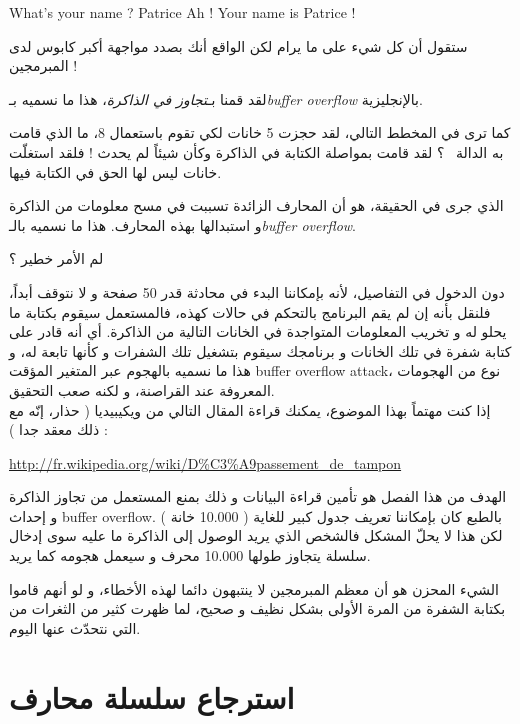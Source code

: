 \begin{Console}
What's your name ? Patrice
Ah ! Your name is Patrice !
\end{Console}

ستقول أن كل شيء على ما يرام لكن الواقع أنك بصدد مواجهة أكبر كابوس لدى المبرمجين !

لقد قمنا بـ\emph{تجاوز في الذاكرة}،
 هذا ما نسميه بـ\emph{\textenglish{buffer overflow}}
بالإنجليزية.

كما ترى في المخطط التالي، لقد حجزت 5 خانات لكي تقوم باستعمال 8، ما الذي قامت به الدالة
~؟
 لقد قامت بمواصلة الكتابة في الذاكرة وكأن شيئاً لم يحدث ! فلقد استغلّت خانات ليس لها الحق في الكتابة فيها.


الذي جرى في الحقيقة، هو أن المحارف الزائدة تسببت في مسح معلومات من الذاكرة و استبدالها بهذه المحارف. هذا ما نسميه بالـ\emph{\textenglish{buffer overflow}}.


\begin{question}
  لم الأمر خطير ؟
\end{question}

دون الدخول في التفاصيل، لأنه بإمكاننا البدء في محادثة  قدر 50 صفحة و لا نتوقف أبداً، فلنقل بأنه إن لم يقم البرنامج بالتحكم في حالات كهذه، فالمستعمل سيقوم بكتابة ما يحلو له و تخريب المعلومات المتواجدة في الخانات التالية من الذاكرة. أي أنه قادر على كتابة شفرة في تلك الخانات و برنامجك سيقوم بتشغيل تلك الشفرات و كأنها تابعة له، و هذا ما نسميه بالهجوم عبر المتغير المؤقت
\textenglish{buffer overflow attack}،
نوع من الهجومات المعروفة عند القراصنة، و لكنه صعب التحقيق.\\
إذا كنت مهتماً بهذا الموضوع، يمكنك قراءة المقال التالي من ويكيبيديا ( حذار، إنّه مع ذلك معقد جدا ) :

\url{http://fr.wikipedia.org/wiki/D%C3%A9passement_de_tampon}

الهدف من هذا الفصل هو تأمين قراءة البيانات و ذلك بمنع المستعمل من تجاوز الذاكرة و إحداث
\textenglish{buffer overflow}.
بالطبع كان بإمكاننا تعريف جدول كبير للغاية ( 10.000 خانة ) لكن هذا لا يحلّ المشكل فالشخص الذي يريد الوصول إلى الذاكرة ما عليه سوى إدخال سلسلة يتجاوز طولها 10.000 محرف و سيعمل هجومه كما يريد.

الشيء المحزن هو أن معظم المبرمجين لا ينتبهون دائما لهذه الأخطاء، و لو أنهم قاموا بكتابة الشفرة من المرة الأولى بشكل نظيف و صحيح، لما ظهرت كثير من الثغرات من التي نتحدّث عنها اليوم.

\section{استرجاع سلسلة محارف}


